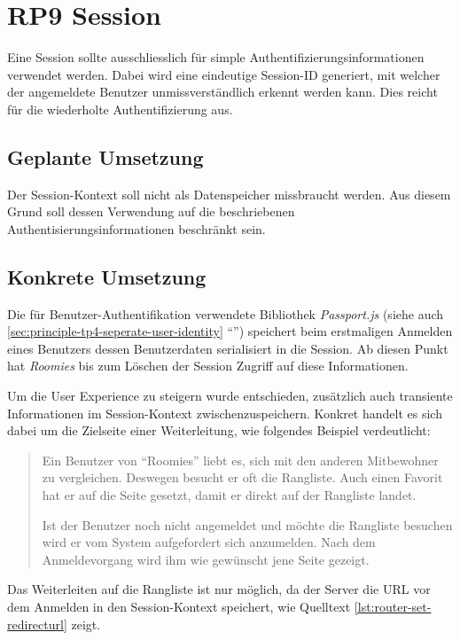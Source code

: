 \section{RP9 Session}
\label{sec:principle-rp9-session}

Eine Session sollte ausschliesslich für simple Authentifizierungsinformationen verwendet werden. Dabei wird eine eindeutige Session-ID generiert, mit welcher der angemeldete Benutzer unmissverständlich erkennt werden kann. Dies reicht für die wiederholte Authentifizierung aus.

\subsection*{Geplante Umsetzung}
Der Session-Kontext soll nicht als Datenspeicher missbraucht werden. Aus diesem Grund soll dessen Verwendung auf die beschriebenen Authentisierungsinformationen beschränkt sein.

\subsection*{Konkrete Umsetzung}
Die für Benutzer-Authentifikation verwendete Bibliothek \emph{Passport.js} \cite{Passportjs} (siehe auch \ref{sec:principle-tp4-seperate-user-identity} ``'') speichert beim erstmaligen Anmelden eines Benutzers dessen Benutzerdaten serialisiert in die Session. Ab diesen Punkt hat \emph{Roomies} bis zum Löschen der Session Zugriff auf diese Informationen.

Um die User Experience zu steigern wurde entschieden, zusätzlich auch transiente Informationen im Session-Kontext zwischenzuspeichern. Konkret handelt es sich dabei um die Zielseite einer Weiterleitung, wie folgendes Beispiel verdeutlicht:

\begin{quotation}
Ein Benutzer von ``Roomies'' liebt es, sich mit den anderen Mitbewohner zu vergleichen. Deswegen besucht er oft die Rangliste. Auch einen Favorit hat er auf die Seite gesetzt, damit er direkt auf der Rangliste landet.

Ist der Benutzer noch nicht angemeldet und möchte die Rangliste besuchen wird er vom System aufgefordert sich anzumelden. Nach dem Anmeldevorgang wird ihm wie gewünscht jene Seite gezeigt.
\end{quotation}

\newpage
Das Weiterleiten auf die Rangliste ist nur möglich, da der Server die \gls{URL} vor dem Anmelden in den Session-Kontext speichert, wie Quelltext \ref{lst:router-set-redirecturl} zeigt.

